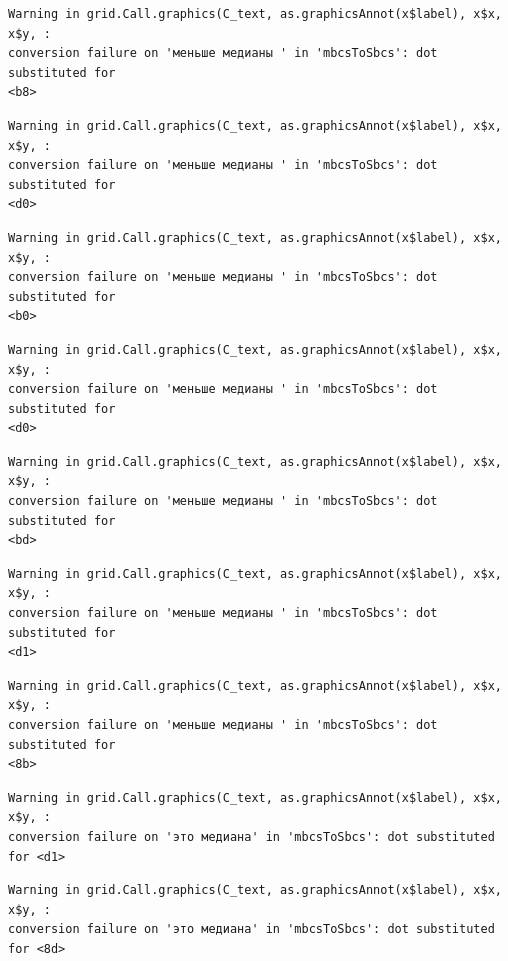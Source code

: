 \documentclass[
  letterpaper,
]{scrbook}
\theoremstyle{definition}
\theoremstyle{remark}
\begin{document}
\begin{verbatim}
Warning in grid.Call.graphics(C_text, as.graphicsAnnot(x$label), x$x, x$y, :
conversion failure on 'меньше медианы ' in 'mbcsToSbcs': dot substituted for
<b8>
\end{verbatim}

\begin{verbatim}
Warning in grid.Call.graphics(C_text, as.graphicsAnnot(x$label), x$x, x$y, :
conversion failure on 'меньше медианы ' in 'mbcsToSbcs': dot substituted for
<d0>
\end{verbatim}

\begin{verbatim}
Warning in grid.Call.graphics(C_text, as.graphicsAnnot(x$label), x$x, x$y, :
conversion failure on 'меньше медианы ' in 'mbcsToSbcs': dot substituted for
<b0>
\end{verbatim}

\begin{verbatim}
Warning in grid.Call.graphics(C_text, as.graphicsAnnot(x$label), x$x, x$y, :
conversion failure on 'меньше медианы ' in 'mbcsToSbcs': dot substituted for
<d0>
\end{verbatim}

\begin{verbatim}
Warning in grid.Call.graphics(C_text, as.graphicsAnnot(x$label), x$x, x$y, :
conversion failure on 'меньше медианы ' in 'mbcsToSbcs': dot substituted for
<bd>
\end{verbatim}

\begin{verbatim}
Warning in grid.Call.graphics(C_text, as.graphicsAnnot(x$label), x$x, x$y, :
conversion failure on 'меньше медианы ' in 'mbcsToSbcs': dot substituted for
<d1>
\end{verbatim}

\begin{verbatim}
Warning in grid.Call.graphics(C_text, as.graphicsAnnot(x$label), x$x, x$y, :
conversion failure on 'меньше медианы ' in 'mbcsToSbcs': dot substituted for
<8b>
\end{verbatim}

\begin{verbatim}
Warning in grid.Call.graphics(C_text, as.graphicsAnnot(x$label), x$x, x$y, :
conversion failure on 'это медиана' in 'mbcsToSbcs': dot substituted for <d1>
\end{verbatim}

\begin{verbatim}
Warning in grid.Call.graphics(C_text, as.graphicsAnnot(x$label), x$x, x$y, :
conversion failure on 'это медиана' in 'mbcsToSbcs': dot substituted for <8d>
\end{verbatim}
\end{document}
